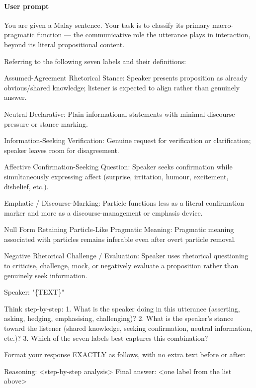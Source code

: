 \documentclass[11pt]{article}
\begin{document}
\paragraph{User prompt}
\begin{PromptBlock}
You are given a Malay sentence. Your task is to classify its primary macro-pragmatic function --- the communicative role the utterance plays in interaction, beyond its literal propositional content.

Referring to the following seven labels and their definitions:

Assumed-Agreement Rhetorical Stance: Speaker presents proposition as already obvious/shared knowledge; listener is expected to align rather than genuinely answer.

Neutral Declarative: Plain informational statements with minimal discourse pressure or stance marking.

Information-Seeking Verification: Genuine request for verification or clarification; speaker leaves room for disagreement.

Affective Confirmation-Seeking Question: Speaker seeks confirmation while simultaneously expressing affect (surprise, irritation, humour, excitement, disbelief, etc.).

Emphatic / Discourse-Marking: Particle functions less as a literal confirmation marker and more as a discourse-management or emphasis device.

Null Form Retaining Particle-Like Pragmatic Meaning: Pragmatic meaning associated with particles remains inferable even after overt particle removal.

Negative Rhetorical Challenge / Evaluation: Speaker uses rhetorical questioning to criticise, challenge, mock, or negatively evaluate a proposition rather than genuinely seek information.

Speaker: "\{TEXT\}"

Think step-by-step:
  1. What is the speaker doing in this utterance (asserting, asking, hedging, emphasising, challenging)?
  2. What is the speaker's stance toward the listener (shared knowledge, seeking confirmation, neutral information, etc.)?
  3. Which of the seven labels best captures this combination?

Format your response EXACTLY as follows, with no extra text before or after:

Reasoning: <step-by-step analysis>
Final answer: <one label from the list above>
\end{PromptBlock}
\end{document}
